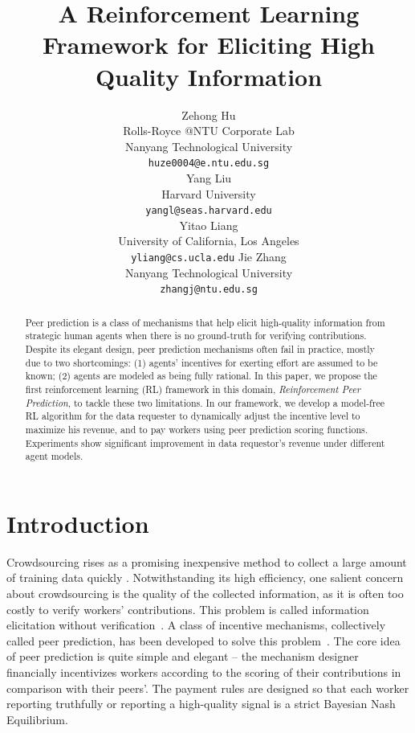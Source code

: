 \documentclass{article}
\title{A Reinforcement Learning Framework for Eliciting High Quality Information}
\author{
  Zehong Hu \\
  Rolls-Royce @NTU Corporate Lab\\
  Nanyang Technological University\\
  \texttt{huze0004@e.ntu.edu.sg} \\
  \And
  Yang Liu \\
  Harvard University \\
  \texttt{yangl@seas.harvard.edu}\\
  \And
  Yitao Liang \\
  University of California, Los Angeles \\
  \texttt{yliang@cs.ucla.edu}
   \And
  Jie Zhang \\
  Nanyang Technological University \\
  \texttt{zhangj@ntu.edu.sg}
}
\begin{document}

\maketitle

\begin{abstract}
Peer prediction is a class of mechanisms that help elicit high-quality information from strategic human agents when there is no ground-truth for verifying contributions. Despite its elegant design, peer prediction mechanisms often fail in practice, mostly due to two shortcomings: (1) agents' incentives for exerting effort %
are assumed to be known;
 (2) agents are modeled as being fully rational. In this paper, we propose the first reinforcement learning (RL) framework in this domain, \emph{Reinforcement Peer Prediction}, to tackle these two limitations.  %
In our framework, we develop a model-free RL algorithm for the data requester to dynamically adjust the incentive level to maximize his revenue, and to pay workers using peer prediction scoring functions. 
 Experiments show significant improvement in data requestor's revenue under different agent models.
\end{abstract}

\section{Introduction}
Crowdsourcing rises as a promising inexpensive method to collect a large amount of training data %
quickly \cite{snow2008cheap,deng2009imagenet}.
Notwithstanding its high efficiency, one salient concern about crowdsourcing is the quality of the collected information, as it is often too costly to verify workers' contributions.
This problem is called information elicitation without verification~\cite{waggoner2014output}.
A class of incentive mechanisms, collectively called peer prediction, has been developed to solve this problem~\cite{miller2005eliciting,jurca2009mechanisms,witkowski2012robust,witkowski2012peer,radanovic2013robust}.
The core idea of peer prediction is quite simple and elegant -- the mechanism designer financially incentivizes 
workers according to the scoring of their contributions in comparison with their peers'. The payment rules are designed so that each worker reporting truthfully or reporting a high-quality signal is a strict Bayesian Nash Equilibrium.
\end{document}
